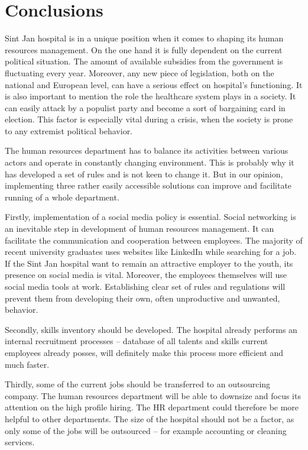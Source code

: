 \documentclass[a4paper,fleqn,11pt,dvips,titlepage]{article}
\numberwithin{figure}{section}
\numberwithin{equation}{section}
\begin{document}
\section{Conclusions}

Sint Jan hospital is in a unique position when it comes to shaping its human resources management. On the one hand it is fully dependent on the current political situation. The amount of available subsidies from the government is fluctuating every year. Moreover, any new piece of legislation, both on the national and European level, can have a serious effect on hospital’s functioning. It is also important to mention the role the healthcare system plays in a society. It can easily attack by a populist party and become a sort of bargaining card in election. This factor is especially vital during a crisis, when the society is prone to any extremist political behavior. 

The human resources department has to balance its activities between various actors and operate in constantly changing environment. This is probably why it has developed a set of rules and is not keen to change it. But in our opinion, implementing three rather easily accessible solutions can improve and facilitate running of a whole department. 

Firstly, implementation of a social media policy is essential. Social networking is an inevitable step in development of human resources management. It can facilitate the communication and cooperation between employees. The majority of recent university graduates uses websites like LinkedIn while searching for a job. If the Sint Jan hospital want to remain an attractive employer to the youth, its presence on social media is vital. Moreover, the employees themselves will use social media tools at work. Establishing clear set of rules and regulations will prevent them from developing their own, often unproductive and unwanted, behavior. 

Secondly, skills inventory should be developed. The hospital already performs an internal recruitment processes – database of all talents and skills current employees already posses, will definitely make this process more efficient and much faster. 

Thirdly, some of the current jobs should be transferred to an outsourcing company. The human resources department will be able to downsize and focus its attention on the high profile hiring. The HR department could therefore be more helpful to other departments. The size of the hospital should not be a factor, as only some of the jobs will be outsourced – for example accounting or cleaning services. 
\end{document}

